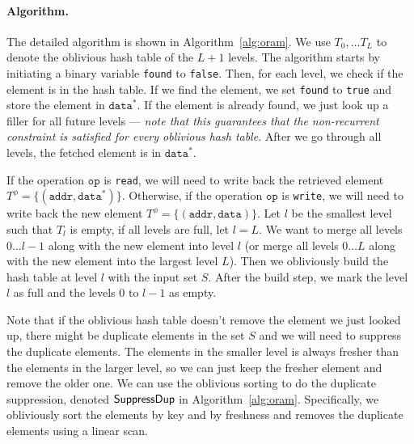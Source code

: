 \paragraph{Algorithm.} The detailed algorithm is 
shown in Algorithm~\ref{alg:oram}. 
We use $T_0, \ldots T_L$ to denote the oblivious hash table
of the $L+1$ levels.
The algorithm starts by initiating a binary variable \texttt{found} to \texttt{false}.
Then, for each level, we check if the element is in the hash table. 
If we find the element, we set \texttt{found} to \texttt{true} and store the element in $\texttt{data}^*$.
If the element is already found, we just look up a filler 
for all future levels 
--- {\it note that 
this guarantees 
that the non-recurrent
constraint is satisfied for every oblivious hash table}.
After we go through all levels, 
the fetched element is in $\texttt{data}^*$.

If the operation $\texttt{op}$ is \texttt{read}, we will need to write back 
the retrieved element $T^\phi = \{(\texttt{addr}, \texttt{data}^*)\}$.
Otherwise, if the operation $\texttt{op}$ is \texttt{write}, we will need to write back the new element $T^\phi = \{(\texttt{addr}, \texttt{data})\}$.
Let $l$ be the smallest level such that $T_l$ is empty, if all levels are full, let $l = L$.
We want to merge all levels $0\ldots l-1$ along with the new element 
into level $l$ (or merge all levels $0\ldots L$ along with the new
element into the largest level $L$). 
Then we obliviously build the hash table at level $l$ with the input set $S$.
After the build step, we mark the level $l$ as 
full and the levels $0$ to $l-1$ as empty.

Note that if the oblivious hash table doesn't remove the element we just looked up, there might be duplicate elements in the set $S$ and we will need to suppress the duplicate elements.
The elements in the smaller level is always fresher than the elements in the larger level, so we can just keep the fresher element and remove the older one.
We can use the oblivious sorting to do the duplicate
suppression, denoted ${\sf SuppressDup}$
in Algorithm~\ref{alg:oram}. 
Specifically, we obliviously sort 
the elements by key and by 
freshness and removes the duplicate elements using a linear scan.


